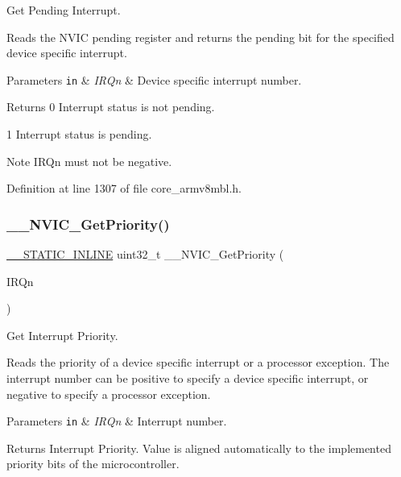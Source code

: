 Get Pending Interrupt. 

Reads the N\+V\+IC pending register and returns the pending bit for the specified device specific interrupt. 
\begin{DoxyParams}[1]{Parameters}
\mbox{\tt in}  & {\em I\+R\+Qn} & Device specific interrupt number. \\
\hline
\end{DoxyParams}
\begin{DoxyReturn}{Returns}
0 Interrupt status is not pending. 

1 Interrupt status is pending. 
\end{DoxyReturn}
\begin{DoxyNote}{Note}
I\+R\+Qn must not be negative. 
\end{DoxyNote}


Definition at line 1307 of file core\+\_\+armv8mbl.\+h.

\mbox{\label{group___c_m_s_i_s___core___n_v_i_c_functions_gaeb9dc99c8e7700668813144261b0bc73}} 
\subsubsection{\texorpdfstring{\+\_\+\+\_\+\+N\+V\+I\+C\+\_\+\+Get\+Priority()}{\_\_NVIC\_GetPriority()}}
{\footnotesize\ttfamily \hyperlink{cmsis__iccarm_8h_aba87361bfad2ae52cfe2f40c1a1dbf9c}{\+\_\+\+\_\+\+S\+T\+A\+T\+I\+C\+\_\+\+I\+N\+L\+I\+NE} uint32\+\_\+t \+\_\+\+\_\+\+N\+V\+I\+C\+\_\+\+Get\+Priority (\begin{DoxyParamCaption}\item[{\hyperlink{group___c_m_s_i_s__18_x_x___i_r_q_gaa44deabd252bda567898bae35a086adc}{I\+R\+Qn\+\_\+\+Type}}]{I\+R\+Qn }\end{DoxyParamCaption})}



Get Interrupt Priority. 

Reads the priority of a device specific interrupt or a processor exception. The interrupt number can be positive to specify a device specific interrupt, or negative to specify a processor exception. 
\begin{DoxyParams}[1]{Parameters}
\mbox{\tt in}  & {\em I\+R\+Qn} & Interrupt number. \\
\hline
\end{DoxyParams}
\begin{DoxyReturn}{Returns}
Interrupt Priority. Value is aligned automatically to the implemented priority bits of the microcontroller. 
\end{DoxyReturn}


